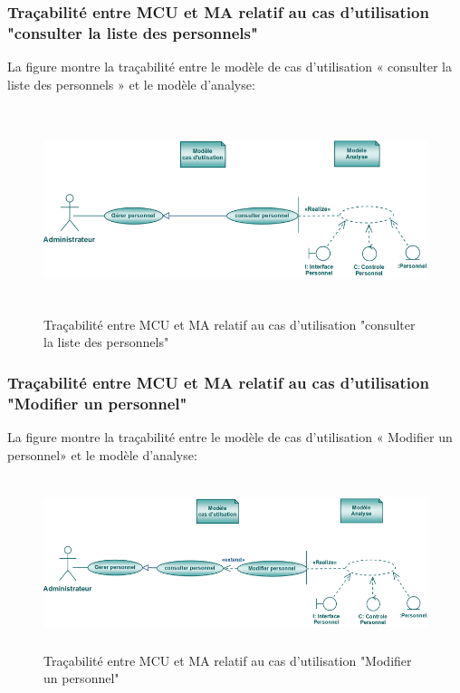\documentclass[12 pt]{report}
\begin{document}
\subsubsection{Traçabilité entre MCU et MA relatif au cas d’utilisation "consulter la liste des personnels" }
La figure  montre la traçabilité entre le modèle de cas d’utilisation « consulter la liste des personnels » et le modèle
d’analyse:
\begin{figure}[h]
\begin{center}
\includegraphics[width= 14cm , height =6cm]{traconsabs.png}
\caption{Traçabilité entre MCU et MA relatif au cas d’utilisation "consulter la liste des personnels"}
\end{center}
\end{figure} 


\subsubsection{Traçabilité entre MCU et MA relatif au cas d’utilisation "Modifier un personnel" }
La figure  montre la traçabilité entre le modèle de cas d’utilisation « Modifier un personnel» et le modèle
d’analyse:
\begin{figure}[h]
\begin{center}
\includegraphics[width= 14cm , height =5cm]{tma.png}
\caption{Traçabilité entre MCU et MA relatif au cas d’utilisation "Modifier un personnel"}
\end{center}
\end{figure}
\end{document}
